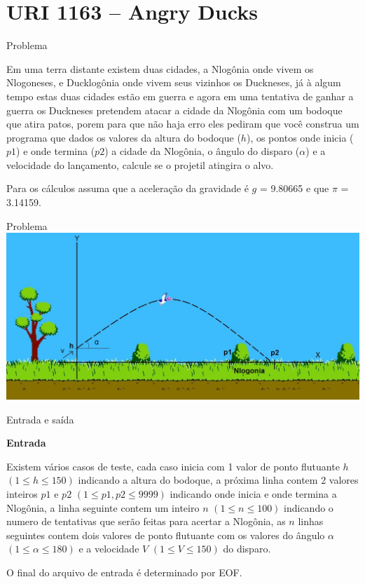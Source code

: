 \section{URI 1163 -- Angry Ducks}

\begin{frame}[fragile]{Problema}

Em uma terra distante existem duas cidades, a Nlogônia onde vivem os Nlogoneses, e Ducklogônia onde vivem seus vizinhos os Duckneses, já à algum tempo estas duas cidades estão em guerra e agora em uma tentativa de ganhar a guerra os Duckneses pretendem atacar a cidade da Nlogônia com um bodoque que atira patos, porem para que não haja erro eles pediram que você construa um programa que dados os valores da altura do bodoque ($h$), os pontos onde inicia ($p1$) e onde termina ($p2$) a cidade da Nlogônia, o ângulo do disparo ($\alpha$) e a velocidade do lançamento, calcule se o projetil atingira o alvo.

Para os cálculos assuma que a aceleração da gravidade é $g$ = 9.80665 e que $\pi$ = 3.14159.
\end{frame}

\begin{frame}[fragile]{Problema}
    \includegraphics[scale=0.25,center]{UOJ_1163.jpg}
\end{frame}

\begin{frame}[fragile]{Entrada e saída}

\textbf{Entrada}

Existem vários casos de teste, cada caso inicia com 1 valor de ponto flutuante $h$ $(1 \leq h \leq 150)$ indicando a altura do bodoque, a próxima linha contem 2 valores inteiros $p1$ e $p2$ $(1 \leq p1, p2 \leq 9999)$ indicando onde inicia e onde termina a Nlogônia, a linha seguinte contem um inteiro $n$ $(1 \leq n \leq 100)$ indicando o numero de tentativas que serão feitas para acertar a Nlogônia, as $n$ linhas seguintes contem dois valores de ponto flutuante com os valores do ângulo $\alpha$ $(1 \leq \alpha \leq 180)$ e a velocidade $V$ $(1 \leq V \leq 150)$ do disparo.

O final do arquivo de entrada é determinado por EOF.
\end{frame}

